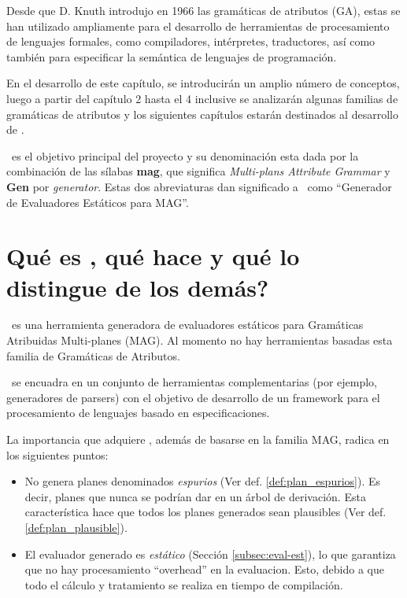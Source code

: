 Desde que D. Knuth introdujo en 1966 las gramáticas de atributos (GA)\cite{Knuth}, estas se han utilizado ampliamente para el desarrollo de herramientas de procesamiento de lenguajes formales, como compiladores, intérpretes, traductores, así  como también para especificar la semántica de lenguajes de programación.

En el desarrollo de este capítulo, se introducirán un amplio número de conceptos, luego a partir del capítulo 2 hasta el 4 inclusive se analizarán algunas familias de gramáticas de atributos y los siguientes capítulos estarán destinados al desarrollo de \maggen. 

\maggen\ es el objetivo principal del proyecto y su denominación esta dada por la combinación de las sílabas \textbf{mag}, que significa \textit{Multi-plans Attribute Grammar} y \textbf{Gen} por \textit{generator}. Estas dos abreviaturas dan significado a \maggen\ como ``Generador de Evaluadores Estáticos para MAG''.

\section{\textquestiondown Qué es \maggen, qué hace y qué lo distingue de los demás?}

\maggen\ es una herramienta generadora de evaluadores estáticos para Gramáticas Atribuidas Multi-planes (MAG). Al momento no hay herramientas basadas esta familia de Gramáticas de Atributos. 

\maggen\ se encuadra en un conjunto de herramientas complementarias (por ejemplo, generadores de parsers) con el objetivo de desarrollo de un framework para el procesamiento de lenguajes basado en especificaciones.

La importancia que adquiere \maggen, además de basarse en la familia MAG, radica en los siguientes puntos: 
\begin{itemize}
 \item No genera planes denominados \textit{espurios} (Ver def. \ref{def:plan_espurios}). Es decir, planes que nunca se podrían dar en un árbol de derivación. Esta característica hace que todos los planes generados sean plausibles (Ver def. \ref{def:plan_plausible}).
 \item El evaluador generado es \textit{estático} (Sección \ref{subsec:eval-est}), lo que garantiza que no hay procesamiento ``overhead'' en la evaluacion. Esto, debido a que todo el cálculo y tratamiento se realiza en tiempo de compilación.
\end{itemize}

